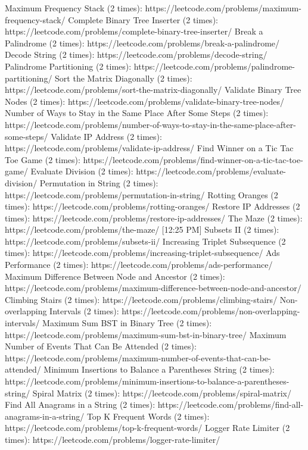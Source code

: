 Maximum Frequency Stack (2 times): https://leetcode.com/problems/maximum-frequency-stack/
Complete Binary Tree Inserter (2 times): https://leetcode.com/problems/complete-binary-tree-inserter/
Break a Palindrome (2 times): https://leetcode.com/problems/break-a-palindrome/
Decode String (2 times): https://leetcode.com/problems/decode-string/
Palindrome Partitioning (2 times): https://leetcode.com/problems/palindrome-partitioning/
Sort the Matrix Diagonally (2 times): https://leetcode.com/problems/sort-the-matrix-diagonally/
Validate Binary Tree Nodes (2 times): https://leetcode.com/problems/validate-binary-tree-nodes/
Number of Ways to Stay in the Same Place After Some Steps (2 times): https://leetcode.com/problems/number-of-ways-to-stay-in-the-same-place-after-some-steps/
Validate IP Address (2 times): https://leetcode.com/problems/validate-ip-address/
Find Winner on a Tic Tac Toe Game (2 times): https://leetcode.com/problems/find-winner-on-a-tic-tac-toe-game/
Evaluate Division (2 times): https://leetcode.com/problems/evaluate-division/
Permutation in String (2 times): https://leetcode.com/problems/permutation-in-string/
Rotting Oranges (2 times): https://leetcode.com/problems/rotting-oranges/
Restore IP Addresses (2 times): https://leetcode.com/problems/restore-ip-addresses/
The Maze (2 times): https://leetcode.com/problems/the-maze/
[12:25 PM]
Subsets II (2 times): https://leetcode.com/problems/subsets-ii/
Increasing Triplet Subsequence (2 times): https://leetcode.com/problems/increasing-triplet-subsequence/
Ads Performance (2 times): https://leetcode.com/problems/ads-performance/
Maximum Difference Between Node and Ancestor (2 times): https://leetcode.com/problems/maximum-difference-between-node-and-ancestor/
Climbing Stairs (2 times): https://leetcode.com/problems/climbing-stairs/
Non-overlapping Intervals (2 times): https://leetcode.com/problems/non-overlapping-intervals/
Maximum Sum BST in Binary Tree (2 times): https://leetcode.com/problems/maximum-sum-bst-in-binary-tree/
Maximum Number of Events That Can Be Attended (2 times): https://leetcode.com/problems/maximum-number-of-events-that-can-be-attended/
Minimum Insertions to Balance a Parentheses String (2 times): https://leetcode.com/problems/minimum-insertions-to-balance-a-parentheses-string/
Spiral Matrix (2 times): https://leetcode.com/problems/spiral-matrix/
Find All Anagrams in a String (2 times): https://leetcode.com/problems/find-all-anagrams-in-a-string/
Top K Frequent Words (2 times): https://leetcode.com/problems/top-k-frequent-words/
Logger Rate Limiter (2 times): https://leetcode.com/problems/logger-rate-limiter/

